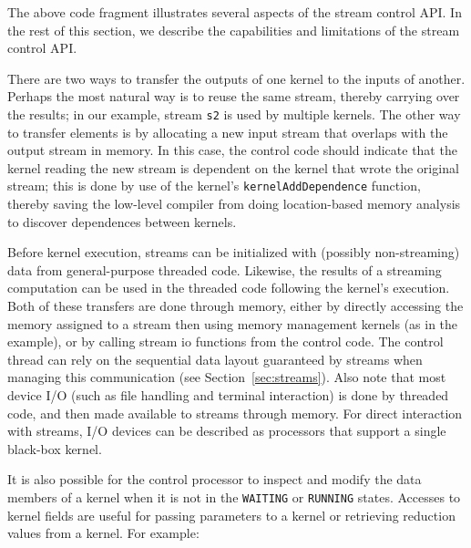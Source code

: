 The above code fragment illustrates several aspects of the stream control API.  In the rest of this section, we describe the 
capabilities and limitations of the stream control API.


There are two ways to transfer the outputs of one kernel to the inputs of another.  Perhaps the most natural way is to reuse the same stream, thereby carrying over the results; in our example, stream {\tt s2} is used by multiple kernels.  The other way to transfer elements is by allocating a new input stream that overlaps with the output stream in memory.  In this case, the control code should indicate that the kernel reading the new stream is dependent on the kernel that wrote the original stream; this is done by use of the kernel's {\tt kernelAddDependence} function, thereby saving the low-level compiler from doing location-based memory analysis to discover dependences between kernels.


Before kernel execution, streams can be initialized with (possibly
non-streaming) data from general-purpose threaded code.  Likewise, the results of a streaming computation can be used in the threaded code following the kernel's execution.  Both of these transfers are done through memory, either by directly accessing the memory assigned to a stream then using memory management kernels (as in the example), or by calling stream io functions from the control code. 
The control thread can rely on the sequential data layout guaranteed by streams when managing this communication (see Section~\ref{sec:streams}). 
Also note that most device I/O (such as file handling and terminal interaction) is done 
by threaded code, and then made available to streams through memory.  
For direct interaction with streams, I/O devices can be described as 
processors that support a single black-box kernel.

It is also possible for the control processor to inspect and modify the data members of a kernel when it is not in the 
{\tt WAITING} or {\tt RUNNING} states. Accesses to kernel fields are 
useful for passing parameters to a kernel or retrieving reduction 
values from a kernel.  For example: 

